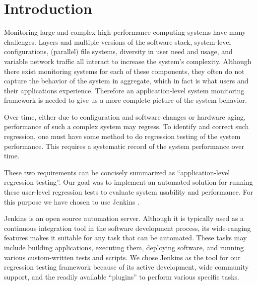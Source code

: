 \documentclass[AMA]{WileyNJD-v1}
\begin{document}

\maketitle

\section{Introduction}
\label{sec:introduction}

Monitoring large and complex high-performance computing systems have many challenges. 
Layers and multiple versions of the software stack, system-level configurations, (parallel) file systems, diversity in user need and usage, and variable network traffic all interact to increase the system's complexity. 
Although there exist monitoring systems for each of these components, they often do not capture the behavior of the system in aggregate, which in fact is what users and their applications experience. 
Therefore an application-level system monitoring framework is needed to give us a more complete picture of the system behavior. 
 

Over time, either due to configuration and software changes or hardware aging, performance of such a complex system may regress. 
To identify and correct such regression, one must have some method to do regression testing of the system performance. 
This requires a systematic record of the system performance over time.

These two requirements can be concisely summarized as ``application-level regression testing''. 
Our goal was to implement an automated solution for running these user-level regression tests to evaluate system usability and performance. 
For this purpose we have chosen to use Jenkins \cite{jenkins}.

Jenkins is an open source automation server. 
Although it is typically used as a continuous integration tool in the software development process, its wide-ranging features makes it suitable for any task that can be automated. 
These tasks may include building applications, executing them, deploying software, and running various custom-written tests and scripts. 
We chose Jenkins as the tool for our regression testing framework because of its active development, wide community support, and the readily available ``plugins'' to perform various specific tasks.
\end{document}
